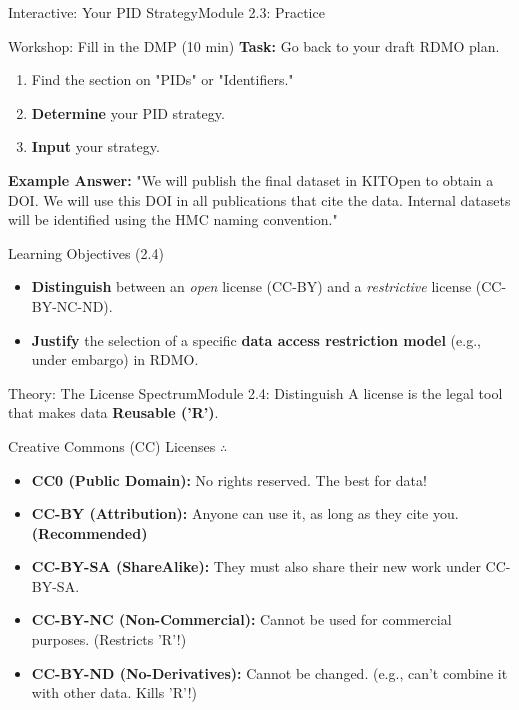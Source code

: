 \begin{frame}{Interactive: Your PID Strategy}{Module 2.3: Practice}
    \begin{block}{Workshop: Fill in the DMP (10 min)}
        \textbf{Task:} Go back to your draft RDMO plan.
        \pause
        \begin{enumerate}
            \item Find the section on "PIDs" or "Identifiers."
            \item \textbf{Determine} your PID strategy.
            \item \textbf{Input} your strategy.
        \end{enumerate}
        \pause
        \textbf{Example Answer:} "We will publish the final dataset in KITOpen to obtain a DOI. We will use this DOI in all publications that cite the data. Internal datasets will be identified using the HMC naming convention."
    \end{block}
\end{frame}

\begin{frame}{Learning Objectives (2.4)}
    \begin{itemize}
        \item \textbf{Distinguish} between an \emph{open} license (CC-BY) and a \emph{restrictive} license (CC-BY-NC-ND).
        \item \textbf{Justify} the selection of a specific \textbf{data access restriction model} (e.g., under embargo) in RDMO.
    \end{itemize}
\end{frame}

\begin{frame}{Theory: The License Spectrum}{Module 2.4: Distinguish}
    A license is the legal tool that makes data \textbf{Reusable ('R')}.
    
    \begin{block}{Creative Commons (CC) Licenses \href{https://creativecommons.org/share-your-work/cclicenses/}{$\therefore$}}
        \begin{itemize}
            \item \textbf{CC0 (Public Domain):} No rights reserved. The best for data!
            \pause
            \item \textbf{CC-BY (Attribution):} Anyone can use it, as long as they cite you. \textbf{(Recommended)}
            \pause
            \item \textbf{CC-BY-SA (ShareAlike):} They must also share their new work under CC-BY-SA.
            \pause
            \item \textbf{CC-BY-NC (Non-Commercial):} Cannot be used for commercial purposes. (Restricts 'R'!)
            \pause
            \item \textbf{CC-BY-ND (No-Derivatives):} Cannot be changed. (e.g., can't combine it with other data. Kills 'R'!)
        \end{itemize}
    \end{block}
\end{frame}

